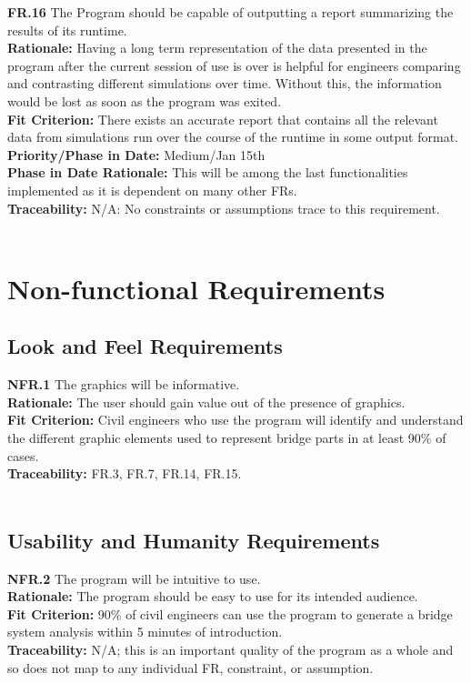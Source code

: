 \documentclass[12pt]{article}
\begin{document}
  \noindent\textbf{FR.16} The Program should be capable of outputting a report summarizing the results of its runtime.\\
  \textbf{Rationale:} Having a long term representation of the data presented in the program after the current session of use is over is helpful for engineers comparing
  and contrasting different simulations over time. Without this, the information would be lost as soon as the program was exited.\\
  \textbf{Fit Criterion:} There exists an accurate report that contains all the relevant data from simulations run over the course of the runtime in some output format.\\
  \textbf{Priority/Phase in Date:} Medium/Jan 15th\\
  \textbf{Phase in Date Rationale:} This will be among the last functionalities implemented as it is dependent on many other FRs.\\
  \textbf{Traceability:} N/A: No constraints or assumptions trace to this requirement.\\\\


\section{Non-functional Requirements}

\subsection{Look and Feel Requirements}

  \textbf{NFR.1} The graphics will be informative.\\
  \textbf{Rationale:} The user should gain value out of the presence of graphics.\\
  \textbf{Fit Criterion:} Civil engineers who use the program will identify and understand the different graphic elements used to represent bridge parts in at least 90\% of cases.\\
  \textbf{Traceability:} FR.3, FR.7, FR.14, FR.15.\\\\

\subsection{Usability and Humanity Requirements}

  \textbf{NFR.2} The program will be intuitive to use.\\
  \textbf{Rationale:} The program should be easy to use for its intended audience.\\
  \textbf{Fit Criterion:} 90\% of civil engineers can use the program to generate a bridge system analysis within 5 minutes of introduction.\\
  \textbf{Traceability:} N/A; this is an important quality of the program as a whole and so does not map to any individual FR, constraint, or assumption.\\\\
\end{document}
